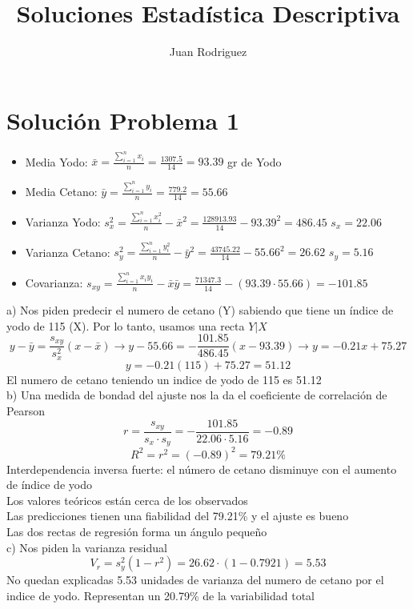 \documentclass[fleqn]{article}
\title{Soluciones Estadística Descriptiva}
\author{Juan Rodriguez}
\begin{document}
	\maketitle
	\section{Solución Problema 1}
	\begin{itemize}
		\item Media Yodo: $\bar{x} = \frac{\sum_{i=1}^n x_i}{n} = \frac{1307.5}{14} = 93.39$ gr de Yodo
		\item Media Cetano: $\bar{y} = \frac{\sum_{i=1}^n y_i}{n} = \frac{779.2}{14} = 55.66$ 
		\item Varianza Yodo: $s_x^{2} = \frac{\sum_{i=1}^n x_i^{2}}{n} - \bar{x}^{2} = \frac{128913.93}{14} - 93.39^{2} = 486.45$ $s_x = 22.06$
		\item Varianza Cetano: $s_y^{2} = \frac{\sum_{i=1}^n y_i^{2}}{n} - \bar{y}^{2} = \frac{43745.22}{14} - 55.66^{2} = 26.62$ $s_y = 5.16$
		\item Covarianza: $s_{xy} = \frac{\sum_{i=1}^n x_i y_i}{n} - \bar{x} \bar{y} = \frac{71347.3}{14} - (93.39 \cdot 55.66) = -101.85$
	\end{itemize}
	a) Nos piden predecir el numero de cetano (Y) sabiendo que tiene un índice de yodo de 115 (X). Por lo tanto, usamos una recta $Y | X$ \\
	\[
	y - \bar{y} = \frac{s_{xy}}{s_x^{2}} (x - \bar{x}) \rightarrow y - 55.66 = -\frac{101.85}{486.45} (x - 93.39) \rightarrow y = -0.21x + 75.27
	\]
	\[
	y = -0.21(115) + 75.27 = \boxed{51.12}
	\]
	El numero de cetano teniendo un indice de yodo de 115 es 51.12 \\
	b) Una medida de bondad del ajuste nos la da el coeficiente de correlación de Pearson
	\[
	r = \frac{s_{xy}}{s_x \cdot s_y} = -\frac{101.85}{22.06 \cdot 5.16} = \boxed{-0.89}
	\]
	\[
	R^2 = r^2 = (-0.89)^{2} = \boxed{79.21\%}
	\]
	Interdependencia inversa fuerte: el número de cetano disminuye con el aumento de índice de yodo \\
	Los valores teóricos están cerca de los observados \\
	Las predicciones tienen una fiabilidad del 79.21\% y el ajuste es bueno \\
	Las dos rectas de regresión forma un ángulo pequeño \\
	c) Nos piden la varianza residual
	\[
	V_r = s_y^2 (1-r^2) = 26.62 \cdot (1-0.7921) = \boxed{5.53} 
	\]
	No quedan explicadas 5.53 unidades de varianza del numero de cetano por el indice de yodo. Representan un 20.79\% de la variabilidad total \\
\end{document}
